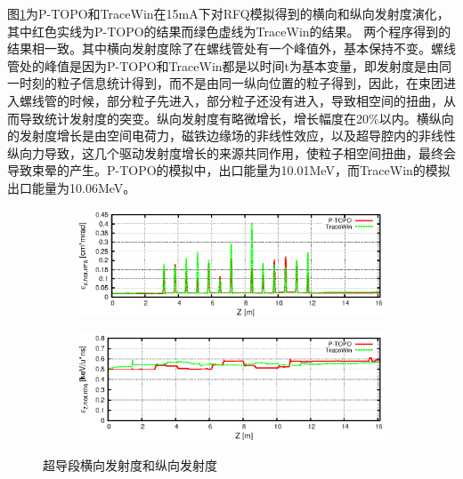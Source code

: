 图\ref{fig:ADS_SC_emit}为P-TOPO和TraceWin在15mA下对RFQ模拟得到的横向和纵向发射度演化，其中红色实线为P-TOPO的结果而绿色虚线为TraceWin的结果。
两个程序得到的结果相一致。其中横向发射度除了在螺线管处有一个峰值外，基本保持不变。螺线管处的峰值是因为P-TOPO和TraceWin都是以时间t为基本变量，即发射度是由同一时刻的粒子信息统计得到，而不是由同一纵向位置的粒子得到，因此，在束团进入螺线管的时候，部分粒子先进入，部分粒子还没有进入，导致相空间的扭曲，从而导致统计发射度的突变。纵向发射度有略微增长，增长幅度在20\%以内。横纵向的发射度增长是由空间电荷力，磁铁边缘场的非线性效应，以及超导腔内的非线性纵向力导致，这几个驱动发射度增长的来源共同作用，使粒子相空间扭曲，最终会导致束晕的产生。P-TOPO的模拟中，出口能量为10.01MeV，而TraceWin的模拟出口能量为10.06MeV。
\begin{figure}[!htb]
    \centering
    \begin{subfigure}[b]{0.9\textwidth}
        \includegraphics[width=\textwidth]{Img/ADS_SC_emit1.eps}
    \end{subfigure}
    \begin{subfigure}[b]{0.9\textwidth}
        \includegraphics[width=\textwidth]{Img/ADS_SC_emit2.eps}
    \end{subfigure}
    \caption{超导段横向发射度和纵向发射度}\label{fig:ADS_SC_emit}
\end{figure}

